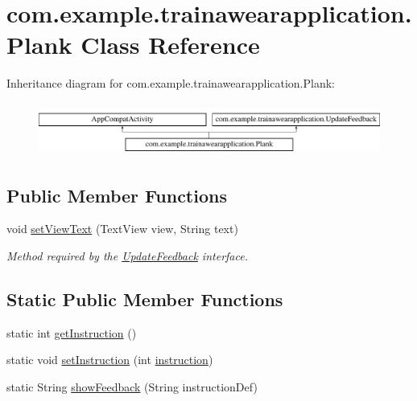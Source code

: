 \hypertarget{classcom_1_1example_1_1trainawearapplication_1_1_plank}{}\section{com.\+example.\+trainawearapplication.\+Plank Class Reference}
\label{classcom_1_1example_1_1trainawearapplication_1_1_plank}
Inheritance diagram for com.\+example.\+trainawearapplication.\+Plank\+:\begin{figure}[H]
\begin{center}
\leavevmode
\includegraphics[height=1.766562cm]{classcom_1_1example_1_1trainawearapplication_1_1_plank}
\end{center}
\end{figure}
\subsection*{Public Member Functions}
\begin{DoxyCompactItemize}
\item 
void \mbox{\hyperlink{classcom_1_1example_1_1trainawearapplication_1_1_plank_a4d4a46b71ced8fe89023ccbf14d17f77}{set\+View\+Text}} (Text\+View view, String text)
\begin{DoxyCompactList}\small\item\em Method required by the \mbox{\hyperlink{interfacecom_1_1example_1_1trainawearapplication_1_1_update_feedback}{Update\+Feedback}} interface. \end{DoxyCompactList}\end{DoxyCompactItemize}
\subsection*{Static Public Member Functions}
\begin{DoxyCompactItemize}
\item 
static int \mbox{\hyperlink{classcom_1_1example_1_1trainawearapplication_1_1_plank_a2220e1459dd56fb27948dcddf79bfcfa}{get\+Instruction}} ()
\item 
static void \mbox{\hyperlink{classcom_1_1example_1_1trainawearapplication_1_1_plank_a3cc3d10c2310227ff9fe69e49afac328}{set\+Instruction}} (int \mbox{\hyperlink{classcom_1_1example_1_1trainawearapplication_1_1_plank_a78c9024e55b5817aa05befcff69394c3}{instruction}})
\item 
static String \mbox{\hyperlink{classcom_1_1example_1_1trainawearapplication_1_1_plank_a14343873d9ff489757bebbad97adbaf1}{show\+Feedback}} (String instruction\+Def)
\end{DoxyCompactItemize}
